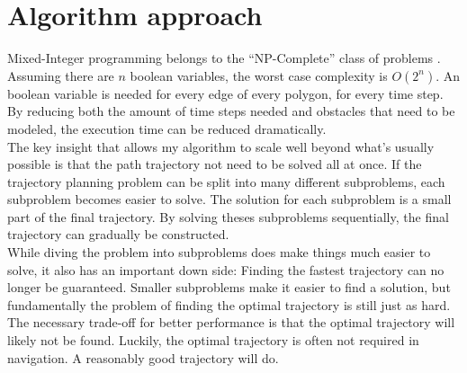 \section{Algorithm approach}
Mixed-Integer programming belongs to the ``NP-Complete'' class of problems \cite{DBLP:conf/coco/Karp72}. Assuming there are $n$ boolean variables, the worst case complexity is $O(2^n)$. An boolean variable is needed for every edge of every polygon, for every time step. By reducing both the amount of time steps needed and obstacles that need to be modeled, the execution time can be reduced dramatically. \\
The key insight that allows my algorithm to scale well beyond what's usually possible is that the path trajectory not need to be solved all at once. If the trajectory planning problem can be split into many different subproblems, each subproblem becomes easier to solve. The solution for each subproblem is a small part of the final trajectory. By solving theses subproblems sequentially, the final trajectory can gradually be constructed. \\
While diving the problem into subproblems does make things much easier to solve, it also has an important down side: Finding the fastest trajectory can no longer be guaranteed. Smaller subproblems make it easier to find a solution, but fundamentally the problem of finding the optimal trajectory is still just as hard. The necessary trade-off for better performance is that the optimal trajectory will likely not be found. Luckily, the optimal trajectory is often not required in navigation. A reasonably good trajectory will do.


